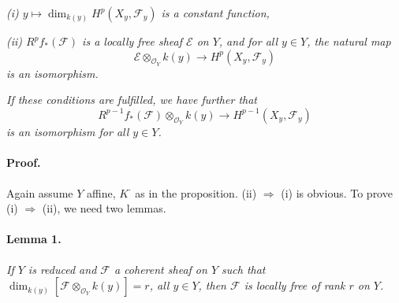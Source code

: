 

\DeclareMathOperator{\coker}{coker}



\textit{(i) $y \longmapsto \dim_{k(y)} H^p(X_y, \mathscr{F}_y)$ is a constant
function,}

\textit{(ii) $R^p f_*(\mathscr{F})$ is a locally free sheaf $\mathscr{E}$ on
$Y$, and for all $y \in Y$, the natural map}
\[
  \mathscr{E} \otimes_{\mathcal{O}_Y} k(y) \longrightarrow H^p(X_y, \mathscr{F}_y)
\]
\textit{is an isomorphism.}

\textit{If these conditions are fulfilled, we have further that}
\[
  R^{p-1} f_*(\mathscr{F}) \otimes_{\mathcal{O}_Y} k(y) \longrightarrow
  H^{p-1}(X_y, \mathscr{F}_y)
\]
\textit{is an isomorphism for all $y \in Y$.}

\paragraph{Proof.}
Again assume $Y$ affine, $K^{\cdot}$ as in the proposition.
(ii) $\Rightarrow$ (i) is obvious. To prove (i) $\Rightarrow$ (ii), we need
two lemmas.

\paragraph{Lemma 1.}
\textit{If $Y$ is reduced and $\mathscr{F}$ a coherent sheaf on $Y$ such that
$\dim_{k(y)}[\mathscr{F} \otimes_{\mathcal{O}_Y} k(y)] = r$, all $y \in Y$,
then $\mathscr{F}$ is locally free of rank $r$ on $Y$.}

